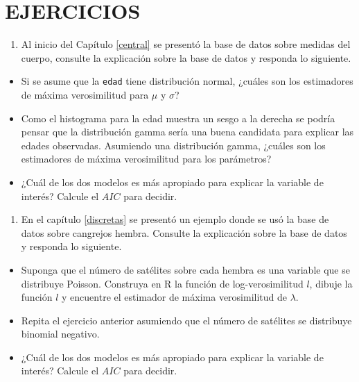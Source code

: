 \documentclass[
]{book}
\providecommand{\tightlist}{%
  \setlength{\itemsep}{0pt}\setlength{\parskip}{0pt}}
\begin{document}
\hypertarget{ejercicios-6}{%
\section*{EJERCICIOS}\label{ejercicios-6}}

\begin{enumerate}
\def\labelenumi{\arabic{enumi})}
\tightlist
\item
  Al inicio del Capítulo \ref{central} se presentó la base de datos sobre medidas del cuerpo, consulte la explicación sobre la base de datos y responda lo siguiente.
\end{enumerate}

\begin{itemize}
\tightlist
\item
  Si se asume que la \texttt{edad} tiene distribución normal, ¿cuáles son los estimadores de máxima verosimilitud para \(\mu\) y \(\sigma\)?
\item
  Como el histograma para la edad muestra un sesgo a la derecha se podría pensar que la distribución gamma sería una buena candidata para explicar las edades observadas. Asumiendo una distribución gamma, ¿cuáles son los estimadores de máxima verosimilitud para los parámetros?
\item
  ¿Cuál de los dos modelos es más apropiado para explicar la variable de interés? Calcule el \(AIC\) para decidir.
\end{itemize}

\begin{enumerate}
\def\labelenumi{\arabic{enumi})}
\setcounter{enumi}{1}
\tightlist
\item
  En el capítulo \ref{discretas} se presentó un ejemplo donde se usó la base de datos sobre cangrejos hembra. Consulte la explicación sobre la base de datos y responda lo siguiente.
\end{enumerate}

\begin{itemize}
\tightlist
\item
  Suponga que el número de satélites sobre cada hembra es una variable que se distribuye Poisson. Construya en R la función de log-verosimilitud \(l\), dibuje la función \(l\) y encuentre el estimador de máxima verosimilitud de \(\lambda\).
\item
  Repita el ejercicio anterior asumiendo que el número de satélites se distribuye binomial negativo.
\item
  ¿Cuál de los dos modelos es más apropiado para explicar la variable de interés? Calcule el \(AIC\) para decidir.
\end{itemize}
\end{document}
